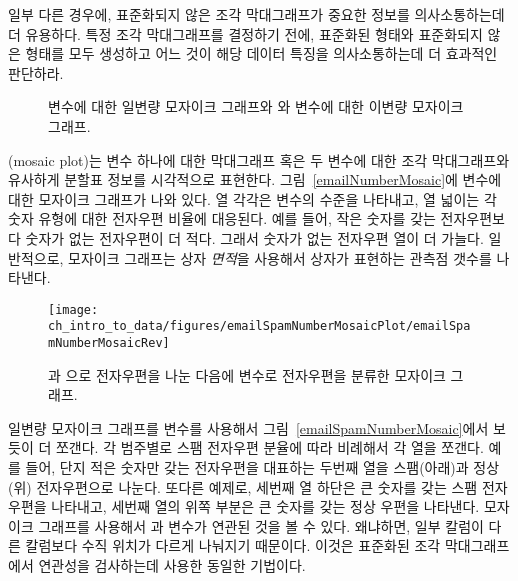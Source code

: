 일부 다른 경우에, 표준화되지 않은 조각 막대그래프가 중요한 정보를 의사소통하는데 더 유용하다. 특정 조각 막대그래프를 결정하기 전에, 표준화된 형태와 표준화되지 않은 형태를 모두 생성하고 어느 것이 해당 데이터 특징을 의사소통하는데 더 효과적인 판단하라.

\begin{figure}
\centering
{}
\caption{  변수에 대한 일변량 모자이크 그래프와  와  변수에 대한 이변량 모자이크 그래프.}
\label{emailSpamNumberMosaicPlot}
\end{figure}

(mosaic plot)는 변수 하나에 대한 막대그래프 혹은 두 변수에 대한 조각 막대그래프와 유사하게 분할표 정보를 시각적으로 표현한다. 그림~\ref{emailNumberMosaic}에  변수에 대한 모자이크 그래프가 나와 있다. 열 각각은  변수의 수준을 나타내고, 열 넓이는 각 숫자 유형에 대한 전자우편 비율에 대응된다.
예를 들어, 작은 숫자를 갖는 전자우편보다 숫자가 없는 전자우편이 더 적다. 그래서 숫자가 없는 전자우편 열이 더 가늘다. 일반적으로, 모자이크 그래프는 상자 \emph{면적}을 사용해서 상자가 표현하는 관측점 갯수를 나타낸다.

\begin{figure}
   \centering
   \texttt{[image: ch\_intro\_to\_data/figures/emailSpamNumberMosaicPlot/emailSpamNumberMosaicRev]}
   \caption{  과 으로 전자우편을 나눈 다음에  변수로 전자우편을 분류한 모자이크 그래프.}
   \label{emailSpamNumberMosaicRev}
\end{figure}

일변량 모자이크 그래프를  변수를 사용해서 그림~\ref{emailSpamNumberMosaic}에서 보듯이 더 쪼갠다. 각 범주별로 스팸 전자우편 분율에 따라 비례해서 각 열을 쪼갠다. 예를 들어, 단지 적은 숫자만 갖는 전자우편을 대표하는 두번째 열을 스팸(아래)과 정상(위) 전자우편으로 나눈다. 또다른 예제로, 세번째 열 하단은 큰 숫자를 갖는 스팸 전자우편을 나타내고, 세번째 열의 위쪽 부분은 큰 숫자를 갖는 정상 우편을 나타낸다. 모자이크 그래프를 사용해서  과  변수가 연관된 것을 볼 수 있다. 왜냐하면, 일부 칼럼이 다른 칼럼보다 수직 위치가 다르게 나눠지기 때문이다. 이것은 표준화된 조각 막대그래프에서 연관성을 검사하는데 사용한 동일한 기법이다.

